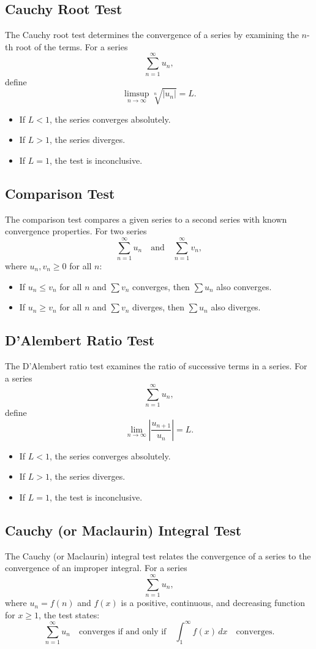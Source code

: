 \documentclass[12pt]{article}
\begin{document}
\subsection{Cauchy Root Test}
The Cauchy root test determines the convergence of a series by examining the \(n\)-th root of the terms. For a series 
\[
\sum_{n=1}^\infty u_n,
\]
define 
\[
\limsup_{n \to \infty} \sqrt[n]{|u_n|} = L.
\]
\begin{itemize}
    \item If \(L < 1\), the series converges absolutely.
    \item If \(L > 1\), the series diverges.
    \item If \(L = 1\), the test is inconclusive.
\end{itemize}

\subsection{Comparison Test}
The comparison test compares a given series to a second series with known convergence properties. For two series 
\[
\sum_{n=1}^\infty u_n \quad \text{and} \quad \sum_{n=1}^\infty v_n,
\]
where \(u_n, v_n \geq 0\) for all \(n\):
\begin{itemize}
    \item If \(u_n \leq v_n\) for all \(n\) and \(\sum v_n\) converges, then \(\sum u_n\) also converges.
    \item If \(u_n \geq v_n\) for all \(n\) and \(\sum v_n\) diverges, then \(\sum u_n\) also diverges.
\end{itemize}

\subsection{D'Alembert Ratio Test}
The D'Alembert ratio test examines the ratio of successive terms in a series. For a series 
\[
\sum_{n=1}^\infty u_n,
\]
define 
\[
\lim_{n \to \infty} \left| \frac{u_{n+1}}{u_n} \right| = L.
\]
\begin{itemize}
    \item If \(L < 1\), the series converges absolutely.
    \item If \(L > 1\), the series diverges.
    \item If \(L = 1\), the test is inconclusive.
\end{itemize}

\subsection{Cauchy (or Maclaurin) Integral Test}
The Cauchy (or Maclaurin) integral test relates the convergence of a series to the convergence of an improper integral. For a series 
\[
\sum_{n=1}^\infty u_n,
\]
where \(u_n = f(n)\) and \(f(x)\) is a positive, continuous, and decreasing function for \(x \geq 1\), the test states:
\[
\sum_{n=1}^\infty u_n \quad \text{converges if and only if} \quad \int_1^\infty f(x) \, dx \quad \text{converges.}
\]
\end{document}
